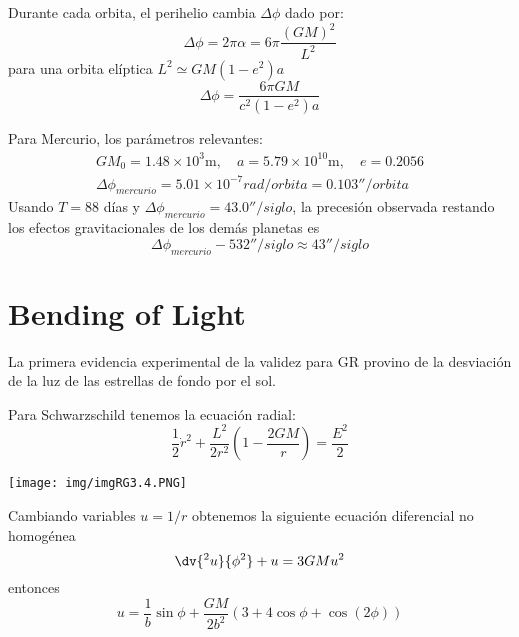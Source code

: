 \documentclass[../main]{subfiles}
\begin{document}
Durante cada orbita, el perihelio cambia $\Delta \phi$ dado por:
\begin{equation}
    \Delta \phi=2\pi \alpha=6\pi\dfrac{(GM)^2}{L^2}
\end{equation}
para una orbita elíptica $L^2 \simeq GM(1-e^2)a$
\begin{equation}
    \Delta \phi = \dfrac{6\pi GM}{c^2(1-e^2)a}
\end{equation}

Para Mercurio, los parámetros relevantes:
\begin{equation}
    \begin{split}
        GM_0=1.48\times 10^3 \text{m},\quad a=5.79\times 10^{10}\text{m},\quad e=0.2056\\
        \Delta \phi_{mercurio}=5.01\times 10^{-7} rad/orbita=0.103''/orbita 
    \end{split}
\end{equation}
Usando $T=88$ días y $\Delta \phi_{mercurio}=43.0''/siglo$, la precesión observada restando los efectos gravitacionales de los demás planetas es 
\begin{equation}
    \Delta \phi_{mercurio}-532''/siglo\approx 43''/siglo
\end{equation}

\section{Bending of Light}

La primera evidencia experimental de la validez para GR provino de la desviación de la luz de las estrellas de fondo por el sol.

Para Schwarzschild tenemos la ecuación radial:
\begin{equation}
    \dfrac{1}{2}\dot{r}^2+\dfrac{L^2}{2r^2}\left(1-\dfrac{2GM}{r}\right)=\dfrac{E^2}{2}
\end{equation}
\begin{center}
    \texttt{[image: img/imgRG3.4.PNG]}
\end{center}

Cambiando variables $u=1/r$ obtenemos la siguiente ecuación diferencial no homogénea
\begin{equation}
    \dv{^2 u}{\phi^2}+u=3GM u^2
\end{equation}
entonces 
\begin{equation}
    u=\dfrac{1}{b}\sin \phi+\dfrac{GM}{2b^2}(3+4\cos \phi+\cos (2\phi))
\end{equation}
\end{document}
